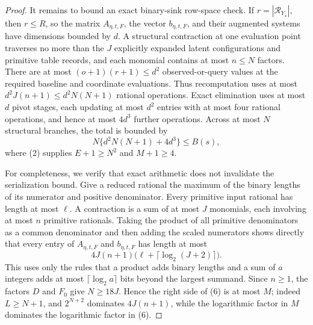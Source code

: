 \documentclass{article}
\begin{document}
\begin{proof}
It remains to bound an exact binary-sink row-space check.  If \(r=|\mathcal R_{Y_{\star}}|\), then \(r\leq R\), so the matrix \(A_{\eta,t,F}\), the vector \(b_{\eta,t,F}\), and their augmented systems have dimensions bounded by \(d\).  A structural contraction at one evaluation point traverses no more than the \(J\) explicitly expanded latent configurations and primitive table records, and each monomial contains at most \(n\leq N\) factors.  There are at most \((o+1)(r+1)\leq d^2\) observed-or-query values at the required baseline and coordinate evaluations.  Thus recomputation uses at most \(d^2J(n+1)\leq d^2N(N+1)\) rational operations.  Exact elimination uses at most \(d\) pivot stages, each updating at most \(d^2\) entries with at most four rational operations, and hence at most \(4d^3\) further operations.  Across at most \(N\) structural branches, the total is bounded by
\[
 N\{d^2N(N+1)+4d^3\}\leq B(s), \tag{5}
\]
where (2) supplies \(E+1\geq N^2\) and \(M+1\geq 4\).

For completeness, we verify that exact arithmetic does not invalidate the serialization bound.  Give a reduced rational the maximum of the binary lengths of its numerator and positive denominator.  Every primitive input rational has length at most \(\ell\).  A contraction is a sum of at most \(J\) monomials, each involving at most \(n\) primitive rationals.  Taking the product of all primitive denominators as a common denominator and then adding the scaled numerators shows directly that every entry of \(A_{\eta,t,F}\) and \(b_{\eta,t,F}\) has length at most
\[
 4J(n+1)\bigl(\ell+\lceil\log_2(J+2)\rceil\bigr). \tag{6}
\]
This uses only the rules that a product adds binary lengths and a sum of \(a\) integers adds at most \(\lceil\log_2 a\rceil\) bits beyond the largest summand.  Since \(n\geq1\), the factors \(D\) and \(F_0\) give \(N\geq18J\).  Hence the right side of (6) is at most \(M\); indeed \(L\geq N+1\), and \(2^{N+2}\) dominates \(4J(n+1)\), while the logarithmic factor in \(M\) dominates the logarithmic factor in (6).


\end{proof}
\end{document}
